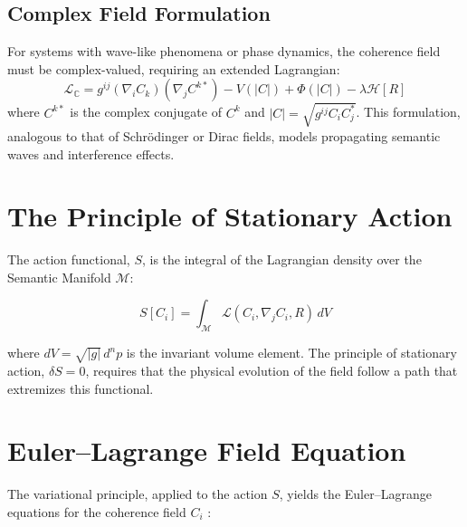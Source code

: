 
\subsection{Complex Field Formulation}
\label{sec:complex_field_formulation}
For systems with wave-like phenomena or phase dynamics, the coherence field must be complex-valued, requiring an extended Lagrangian:
\begin{equation}
\mathcal{L}_{\mathbb{C}} = g^{ij} (\nabla_i C_k)(\nabla_j C^{k*}) - V(|C|) + \Phi(|C|) - \lambda \mathcal{H}[R]
\end{equation}
where \(C^{k*}\) is the complex conjugate of \(C^k\) and \(|C| = \sqrt{g^{ij} C_i C_j^*}\). This formulation, analogous to that of Schrödinger or Dirac fields, models propagating semantic waves and interference effects.


\section{The Principle of Stationary Action}
\label{sec:the_principle_of_stationary_action}

The action functional, \(S\), is the integral of the Lagrangian density over the Semantic Manifold \(\mathcal{M}\):

\begin{equation}
S[C_i] = \int_{\mathcal{M}} \mathcal{L}(C_i, \nabla_j C_i, R) \, dV
\end{equation}

where \(dV = \sqrt{|g|} \, d^n p\) is the invariant volume element. The principle of stationary action, \(\delta S = 0\), requires that the physical evolution of the field follow a path that extremizes this functional.


\section{Euler–Lagrange Field Equation}
\label{sec:euler_lagrange_field_equation}

The variational principle, applied to the action \(S\), yields the Euler–Lagrange equations for the coherence field \(C_i\) \autocite{Euler1744, Lagrange1788}:

